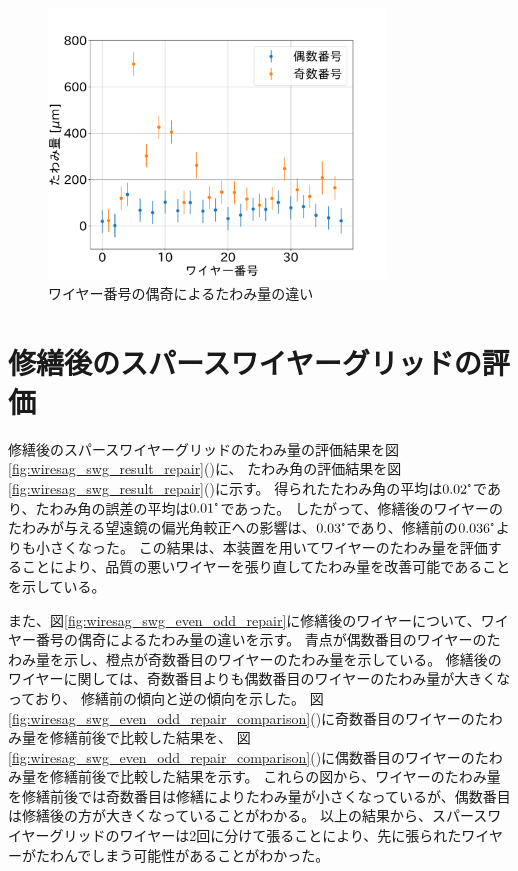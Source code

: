 \documentclass[../../main.tex]{subfiles}
\begin{document}
\begin{figure}[H]
    \centering
    \includegraphics[width=0.8\textwidth]{wiresag_swg/swg_sag_before_even_odd.pdf}
    \caption{ワイヤー番号の偶奇によるたわみ量の違い}
    \label{fig:wiresag_swg_even_odd}    
\end{figure}

\section{修繕後のスパースワイヤーグリッドの評価}
修繕後のスパースワイヤーグリッドのたわみ量の評価結果を図\ref{fig:wiresag_swg_result_repair}()に、
たわみ角の評価結果を図\ref{fig:wiresag_swg_result_repair}()に示す。
得られたたわみ角の平均は$0.02\tcdegree$であり、たわみ角の誤差の平均は$0.01\tcdegree$であった。
したがって、修繕後のワイヤーのたわみが与える望遠鏡の偏光角較正への影響は、$0.03\tcdegree$であり、修繕前の$0.036\tcdegree$よりも小さくなった。
この結果は、本装置を用いてワイヤーのたわみ量を評価することにより、品質の悪いワイヤーを張り直してたわみ量を改善可能であることを示している。

また、図\ref{fig:wiresag_swg_even_odd_repair}に修繕後のワイヤーについて、ワイヤー番号の偶奇によるたわみ量の違いを示す。
青点が偶数番目のワイヤーのたわみ量を示し、橙点が奇数番目のワイヤーのたわみ量を示している。
修繕後のワイヤーに関しては、奇数番目よりも偶数番目のワイヤーのたわみ量が大きくなっており、
修繕前の傾向と逆の傾向を示した。
図\ref{fig:wiresag_swg_even_odd_repair_comparison}()に奇数番目のワイヤーのたわみ量を修繕前後で比較した結果を、
図\ref{fig:wiresag_swg_even_odd_repair_comparison}()に偶数番目のワイヤーのたわみ量を修繕前後で比較した結果を示す。
これらの図から、ワイヤーのたわみ量を修繕前後では奇数番目は修繕によりたわみ量が小さくなっているが、偶数番目は修繕後の方が大きくなっていることがわかる。
以上の結果から、スパースワイヤーグリッドのワイヤーは2回に分けて張ることにより、先に張られたワイヤーがたわんでしまう可能性があることがわかった。
\end{document}
